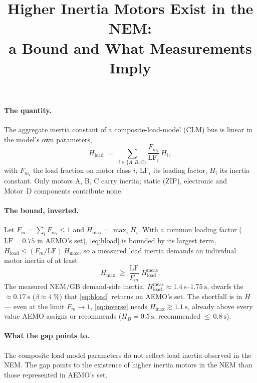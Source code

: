 \documentclass[11pt]{article}
\title{\vspace{-2em}Higher Inertia Motors Exist in the NEM:\\
\large a Bound and What Measurements Imply}
\author{}
\date{}
\begin{document}
\maketitle
\vspace{-3em}

\paragraph{The quantity.}
The aggregate inertia constant of a composite-load-model (CLM) bus is linear in
the model's own parameters,
\begin{equation}
  H_{\mathrm{load}} \;=\; \sum_{i\in\{A,B,C\}} \frac{F_{m_i}}{\mathrm{LF}_i}\,H_i,
  \label{eq:hload}
\end{equation}
with $F_{m_i}$ the load fraction on motor class $i$, $\mathrm{LF}_i$ its loading
factor, $H_i$ its inertia constant. Only motors A, B, C carry inertia; static
(ZIP), electronic and Motor~D components contribute none.

\paragraph{The bound, inverted.}
Let $F_m=\sum_i F_{m_i}\le 1$ and $H_{\max}=\max_i H_i$. With a common loading
factor ($\mathrm{LF}=0.75$ in AEMO's set), \eqref{eq:hload} is bounded by its
largest term, $H_{\mathrm{load}}\le (F_m/\mathrm{LF})\,H_{\max}$, so a measured
load inertia demands an individual motor inertia of at least
\begin{equation}
  H_{\max} \;\ge\; \frac{\mathrm{LF}}{F_m}\;H_{\mathrm{load}}^{\mathrm{meas}}.
  \label{eq:inverse}
\end{equation}
The measured NEM/GB demand-side inertia,
$H_{\mathrm{load}}^{\mathrm{meas}}\approx\SIrange{1.4}{1.75}{\second}$, dwarfs the
$\approx\SI{0.17}{\second}$ ($\beta\approx\SI{4}{\percent}$) that \eqref{eq:hload}
returns on AEMO's set. The shortfall is in $H$ --- even at the limit $F_m\!\to\!1$, \eqref{eq:inverse} needs
$H_{\max}\gtrsim\SI{1.1}{\second}$, already above every value AEMO assigns or
recommends ($H_B=\SI{0.5}{\second}$, recommended ${\le}\,\SI{0.8}{\second}$).

\paragraph{What the gap points to.}
The composite load model parameters do not reflect load inertia observed in the NEM.
The gap points to the existence of higher inertia motors in the NEM than those represented in AEMO's set.
\end{document}
